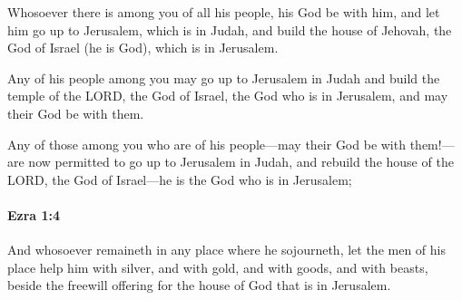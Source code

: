 			\begin{versebox}
					\item[BHS] 
					\item[LXX] 
					\item[ASV] Whosoever there is among you of all his people, his God be with him, and let him go up to Jerusalem, which is in Judah, and build the house of Jehovah, the God of Israel (he is God), which is in Jerusalem.
					\item[NIV] Any of his people among you may go up to Jerusalem in Judah and build the temple of the LORD, the God of Israel, the God who is in Jerusalem, and may their God be with them.
					\item[NRSV] Any of those among you who are of his people—may their God be with them!—are now permitted to go up to Jerusalem in Judah, and rebuild the house of the LORD, the God of Israel—he is the God who is in Jerusalem;
			\end{versebox}

		\paragraph{Ezra 1:4} %
			\label{EZRA-1-4}

			And whosoever remaineth in any place where he sojourneth, let the men of his place help him with silver, and with gold, and with goods, and with beasts, beside the freewill offering for the house of God that is in Jerusalem.

